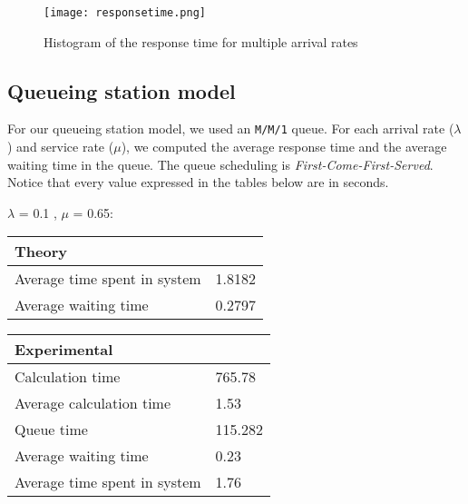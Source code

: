 \begin{figure}[!ht]
    \centering
    \texttt{[image: responsetime.png]}
    \caption{Histogram of the response time for multiple arrival rates}
    \label{fig:historesponse}
\end{figure}

\subsection{Queueing station model}
\label{sub:Queueing station model}

For our queueing station model, we used an \texttt{M/M/1} queue. For each
arrival rate ($\lambda$) and service rate ($\mu$), we computed the
average response time and the average waiting time in the queue. The queue
scheduling is \textit{First-Come-First-Served}. Notice that
every value expressed in the tables below are in seconds.


\begin{minipage}{\linewidth}
    $\lambda$ = 0.1 , $\mu$ = 0.65:

    \bigskip
    \begin{minipage}{0.45\linewidth}
        \begin{tabular}{|l|l|}
            \hline
            Theory & \\
            \hline
            Average time spent in system & 1.8182 \\
            Average waiting time & 0.2797 \\
            \hline
        \end{tabular}
    \end{minipage}
    \begin{minipage}{0.45\linewidth}
        \begin{tabular}{|l|l|}
            \hline
            Experimental & \\
            \hline
            Calculation time & 765.78 \\
            Average calculation time & 1.53 \\
            Queue time & 115.282 \\
            Average waiting time & 0.23 \\
            Average time spent in system & 1.76 \\
            \hline
        \end{tabular}
    \end{minipage}
    \bigskip
\end{minipage}

